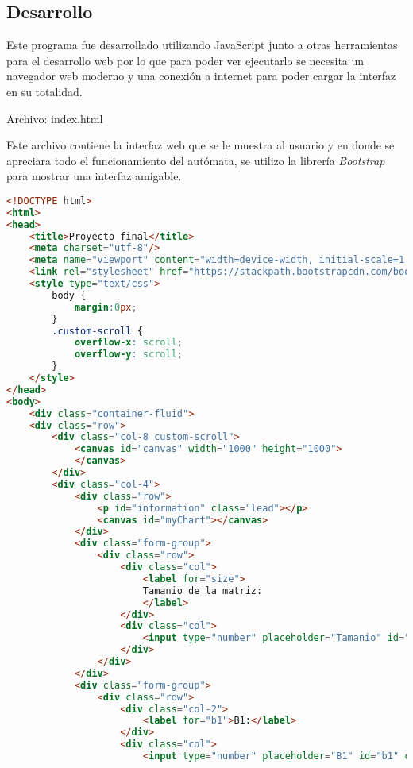 \documentclass[a4paper,12pt]{article}
\begin{document}
\subsection{Desarrollo}
Este programa fue desarrollado utilizando JavaScript junto a otras herramientas para el desarrollo web por lo que para poder ver ejecutarlo se necesita un navegador web moderno y una conexión a internet para poder cargar la interfaz en su totalidad.

Archivo: index.html

Este archivo contiene la interfaz web que se le muestra al usuario y en donde se apreciara todo el funcionamiento del autómata, se utilizo la librería \emph{Bootstrap} para mostrar una interfaz amigable.

\begin{lstlisting}[language=html]
<!DOCTYPE html>
<html>
<head>
    <title>Proyecto final</title>
    <meta charset="utf-8"/>
    <meta name="viewport" content="width=device-width, initial-scale=1.0"/>
    <link rel="stylesheet" href="https://stackpath.bootstrapcdn.com/bootstrap/4.1.3/css/bootstrap.min.css" integrity="sha384-MCw98/SFnGE8fJT3GXwEOngsV7Zt27NXFoaoApmYm81iuXoPkFOJwJ8ERdknLPMO" crossorigin="anonymous">
    <style type="text/css">
        body {
            margin:0px;
        }
        .custom-scroll {
            overflow-x: scroll;
            overflow-y: scroll;
        }
    </style>
</head>
<body>
    <div class="container-fluid">
    <div class="row">
        <div class="col-8 custom-scroll">
            <canvas id="canvas" width="1000" height="1000">
            </canvas>
        </div>
        <div class="col-4">
            <div class="row">
                <p id="information" class="lead"></p>
                <canvas id="myChart"></canvas>
            </div>
            <div class="form-group">
                <div class="row">
                    <div class="col">
                        <label for="size">
                        Tamanio de la matriz:
                        </label>
                    </div>
                    <div class="col">
                        <input type="number" placeholder="Tamanio" id="size" class="form-control" value="100"/>
                    </div>
                </div>
            </div>
            <div class="form-group">
                <div class="row">
                    <div class="col-2">
                        <label for="b1">B1:</label>
                    </div>
                    <div class="col">
                        <input type="number" placeholder="B1" id="b1" class="form-control" value="2"/>

\end{lstlisting}
\end{document}
